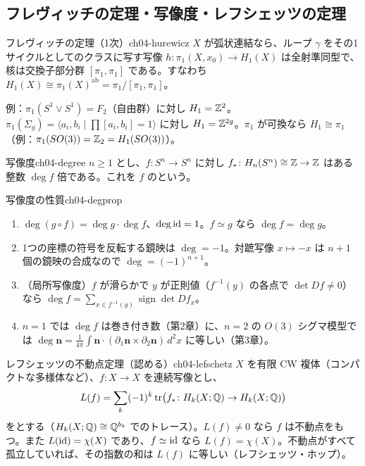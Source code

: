 \subsection{フレヴィッチの定理・写像度・レフシェッツの定理}

\begin{mythm}{フレヴィッチの定理（1次）}{ch04-hurewicz}
$X$ が弧状連結なら、ループ $\gamma$ をその1サイクルとしてのクラスに写す写像 $h\colon\pi_1(X,x_0)\to H_1(X)$ は全射準同型で、核は交換子部分群 $[\pi_1,\pi_1]$ である。すなわち $H_1(X)\cong\pi_1(X)^{\mathrm{ab}}=\pi_1/[\pi_1,\pi_1]$。
\end{mythm}
例：$\pi_1(S^1\vee S^1)=F_2$（自由群）に対し $H_1=\mathbb{Z}^2$。$\pi_1(\Sigma_g)=\langle a_i,b_i\mid\prod[a_i,b_i]=1\rangle$ に対し $H_1=\mathbb{Z}^{2g}$。$\pi_1$ が可換なら $H_1\cong\pi_1$（例：$\pi_1(SO(3))=\mathbb{Z}_2=H_1(SO(3))$）。

\begin{mydef}{写像度}{ch04-degree}
$n\ge1$ とし、$f\colon S^n\to S^n$ に対し $f_*\colon H_n(S^n)\cong\mathbb{Z}\to\mathbb{Z}$ はある整数 $\deg f$ 倍である。これを $f$ のという。
\end{mydef}

\begin{myprop}{写像度の性質}{ch04-degprop}
\begin{enumerate}
\item $\deg(g\circ f)=\deg g\cdot\deg f$、$\deg\mathrm{id}=1$。$f\simeq g$ なら $\deg f=\deg g$。
\item 1つの座標の符号を反転する鏡映は $\deg=-1$。対蹠写像 $x\mapsto-x$ は $n+1$ 個の鏡映の合成なので $\deg=(-1)^{n+1}$。
\item（局所写像度）$f$ が滑らかで $y$ が正則値（$f^{-1}(y)$ の各点で $\det Df\ne0$）なら $\deg f=\sum_{x\in f^{-1}(y)}\operatorname{sign}\det Df_x$。
\item $n=1$ では $\deg f$ は巻き付き数（第2章）に、$n=2$ の $O(3)$ シグマ模型では $\deg\bm n=\frac1{4\pi}\int\bm n\cdot(\partial_1\bm n\times\partial_2\bm n)\,d^2x$ に等しい（第3章）。
\end{enumerate}
\end{myprop}

\begin{mythm}{レフシェッツの不動点定理（認める）}{ch04-lefschetz}
$X$ を有限 CW 複体（コンパクトな多様体など）、$f\colon X\to X$ を連続写像とし、
\[
L(f)=\sum_k(-1)^k\tr\bigl(f_*\colon H_k(X;\mathbb{Q})\to H_k(X;\mathbb{Q})\bigr)
\]
をとする（$H_k(X;\mathbb{Q})\cong\mathbb{Q}^{b_k}$ でのトレース）。$L(f)\ne0$ なら $f$ は不動点をもつ。また $L(\mathrm{id})=\chi(X)$ であり、$f\simeq\mathrm{id}$ なら $L(f)=\chi(X)$。不動点がすべて孤立していれば、その指数の和は $L(f)$ に等しい（レフシェッツ・ホップ）。
\end{mythm}

